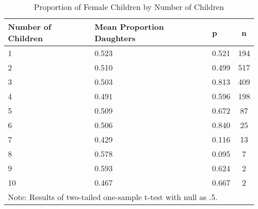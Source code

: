 \begin{table}[!htb]
\centering
\caption{Proportion of Female Children by Number of Children} 
\label{tab:balance_prop_female_nchild}
\begingroup\small
\begin{tabular}{lllc}
  \hline
Number of Children & Mean Proportion Daughters & p & n \\ 
  \hline
   1 & 0.523 & 0.521 &  194 \\ 
     2 & 0.510 & 0.499 &  517 \\ 
     3 & 0.503 & 0.813 &  409 \\ 
     4 & 0.491 & 0.596 &  198 \\ 
     5 & 0.509 & 0.672 &   87 \\ 
     6 & 0.506 & 0.840 &   25 \\ 
     7 & 0.429 & 0.116 &   13 \\ 
     8 & 0.578 & 0.095 &    7 \\ 
     9 & 0.593 & 0.624 &    2 \\ 
    10 & 0.467 & 0.667 &    2 \\ 
   \hline 
 \multicolumn{3}{l}{\scriptsize{Note: Results of two-tailed one-sample t-test with null as .5.}} \hline
\end{tabular}
\endgroup
\end{table}
